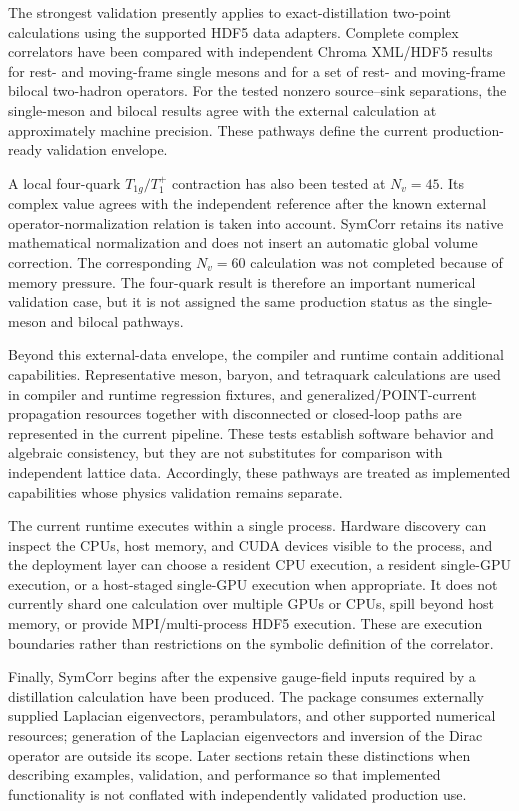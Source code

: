 \documentclass[11pt]{article}
\begin{document}
The strongest validation presently applies to exact-distillation two-point
calculations using the supported HDF5 data adapters. Complete complex
correlators have been compared with independent Chroma XML/HDF5 results for
rest- and moving-frame single mesons and for a set of rest- and moving-frame
bilocal two-hadron operators. For the tested nonzero source--sink separations,
the single-meson and bilocal results agree with the external calculation at
approximately machine precision. These pathways define the current
production-ready validation envelope.

A local four-quark \(T_{1g}/T_1^+\) contraction has also been tested at
\(N_v=45\). Its complex value agrees with the independent reference after the
known external operator-normalization relation is taken into account. SymCorr
retains its native mathematical normalization and does not insert an automatic
global volume correction. The corresponding \(N_v=60\) calculation was not
completed because of memory pressure. The four-quark result is therefore an
important numerical validation case, but it is not assigned the same
production status as the single-meson and bilocal pathways.

Beyond this external-data envelope, the compiler and runtime contain additional
capabilities. Representative meson, baryon, and tetraquark calculations are
used in compiler and runtime regression fixtures, and generalized/POINT-current
propagation resources together with disconnected or closed-loop paths are
represented in the current pipeline. These tests establish software behavior
and algebraic consistency, but they are not substitutes for comparison with
independent lattice data. Accordingly, these pathways are treated as
implemented capabilities whose physics validation remains separate.

The current runtime executes within a single process. Hardware discovery can
inspect the CPUs, host memory, and CUDA devices visible to the process, and the
deployment layer can choose a resident CPU execution, a resident single-GPU
execution, or a host-staged single-GPU execution when appropriate. It does not
currently shard one calculation over multiple GPUs or CPUs, spill beyond host
memory, or provide MPI/multi-process HDF5 execution. These are execution
boundaries rather than restrictions on the symbolic definition of the
correlator.

Finally, SymCorr begins after the expensive gauge-field inputs required by a
distillation calculation have been produced. The package consumes externally
supplied Laplacian eigenvectors, perambulators, and other supported numerical
resources; generation of the Laplacian eigenvectors and inversion of the Dirac
operator are outside its scope. Later sections retain these distinctions when
describing examples, validation, and performance so that implemented
functionality is not conflated with independently validated production use.
\end{document}
